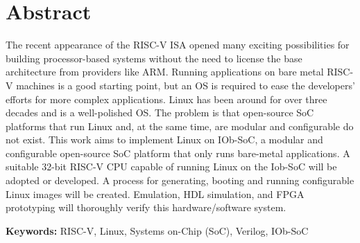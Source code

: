 \cleardoubleoddpage

\chapter*{Abstract}
\thispagestyle{empty} %
The recent appearance of the RISC-V ISA opened many exciting possibilities for building processor-based systems without the need to license the base architecture from providers like ARM. Running applications on bare metal RISC-V machines is a good starting point, but an OS is required to ease the developers' efforts for more complex applications. Linux has been around for over three decades and is a well-polished OS. The problem is that open-source SoC platforms that run Linux and, at the same time, are modular and configurable do not exist.
This work aims to implement Linux on IOb-SoC, a modular and configurable open-source SoC platform that only runs bare-metal applications. A suitable 32-bit RISC-V CPU capable of running Linux on the Iob-SoC will be adopted or developed. A process for generating, booting and running configurable Linux images will be created. Emulation, HDL simulation, and FPGA prototyping will thoroughly verify this hardware/software system.


\vfill

\textbf{\Large Keywords:} RISC-V, Linux, Systems on-Chip (SoC), Verilog, IOb-SoC